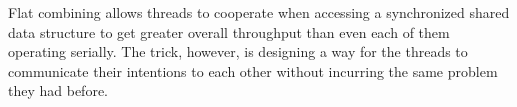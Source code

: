 Flat combining allows threads to cooperate when accessing a synchronized shared data structure to get greater overall throughput than even each of them operating serially. The trick, however, is designing a way for the threads to communicate their intentions to each other without incurring the same problem they had before.
